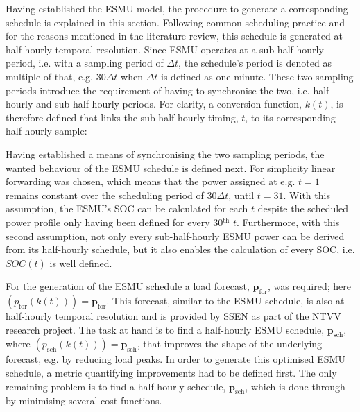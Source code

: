 Having established the ESMU model, the procedure to generate a corresponding schedule is explained in this section.
Following common scheduling practice and for the reasons mentioned in the literature review, this schedule is generated at half-hourly temporal resolution.
Since ESMU operates at a sub-half-hourly period, i.e. with a sampling period of $\Delta t$, the schedule's period is denoted as multiple of that, e.g. $30\Delta t$ when $\Delta t$ is defined as one minute.
These two sampling periods introduce the requirement of having to synchronise the two, i.e. half-hourly and sub-half-hourly periods.
For clarity, a conversion function, $k(t)$, is therefore defined that links the sub-half-hourly timing, $t$, to its corresponding half-hourly sample:



Having established a means of synchronising the two sampling periods, the wanted behaviour of the ESMU schedule is defined next.
For simplicity linear forwarding was chosen, which means that the power assigned at e.g. $t=1$ remains constant over the scheduling period of $30\Delta t$, until $t=31$.
With this assumption, the ESMU's SOC can be calculated for each $t$ despite the scheduled power profile only having been defined for every 30$^\text{th}$ $t$.
Furthermore, with this second assumption, not only every sub-half-hourly ESMU power can be derived from its half-hourly schedule, but it also enables the calculation of every SOC, i.e. $SOC(t)$ is well defined.


For the generation of the ESMU schedule a load forecast, $\textbf{p}_\text{for}$, was required; here $(p_\text{for}(k(t))) = \textbf{p}_\text{for}$.
This forecast, similar to the ESMU schedule, is also at half-hourly temporal resolution and is provided by SSEN as part of the NTVV research project.
The task at hand is to find a half-hourly ESMU schedule, $\textbf{p}_\text{sch}$, where $(p_\text{sch}(k(t))) = \textbf{p}_\text{sch}$, that improves the shape of the underlying forecast, e.g. by reducing load peaks.
In order to generate this optimised ESMU schedule, a metric quantifying improvements had to be defined first.
The only remaining problem is to find a half-hourly schedule, $\textbf{p}_\text{sch}$, which is done through by minimising several cost-functions.


